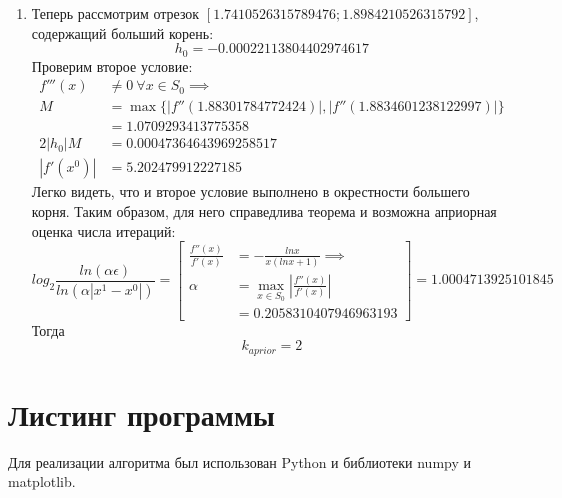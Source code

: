 \documentclass[14pt, a4paper]{article}
\begin{document}
\begin{itemize}
\begin{enumerate}
    \item
    Теперь рассмотрим отрезок $[1.7410526315789476; 1.8984210526315792]$, содержащий больший корень:
    \begin{equation*}h_0 = -0.00022113804402974617\end{equation*}
    Проверим второе условие: \begin{align*}f'''(x) &\neq 0 \ \forall x \in S_0 \implies \\ M &= \max\{|f''(1.88301784772424)|, |f''(1.8834601238122997)|\} \\ &= 1.0709293413775358 \\
    2|h_0|M &= 0.00047364643969258517 \\ |f'(x^0)| &= 5.202479912227185\end{align*}
    Легко видеть, что и второе условие выполнено в окрестности большего корня. Таким образом, для него справедлива теорема и возможна априорная оценка числа итераций:
    \begin{equation}log_2\frac{ln(\alpha\epsilon)}{ln(\alpha|x^1 - x^0|)} = \left[\begin{aligned}\frac{f''(x)}{f'(x)} &= -\frac{lnx}{x(lnx+1)} \implies \\
    \alpha &= \max\limits_{x \in S_0} \left|\frac{f''(x)}{f'(x)}\right| \\ &= 0.2058310407946963193 \end{aligned} \right] = 1.0004713925101845\end{equation}
    Тогда \begin{equation}k_{aprior} = 2\end{equation}

    \end{enumerate}
  \end{itemize}
  \section{Листинг программы}
  Для реализации алгоритма был использован Python и библиотеки numpy и matplotlib.
\end{document}
